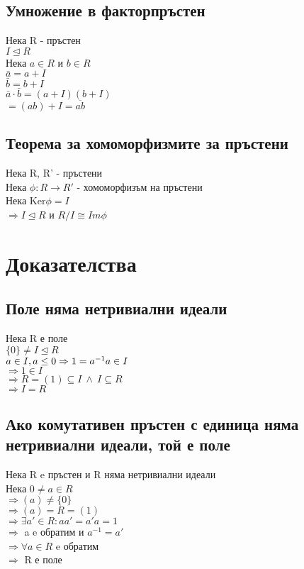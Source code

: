 \documentclass[12pt]{article}
\begin{document}
\clearpage
\subsection{Умножение в факторпръстен}
Нека R - пръстен\\
$I \trianglelefteq R$ \\
Нека $a \in R$ и $b \in R$ \\
$\bar{a} = a + I$\\
$\bar{b} = b + I$\\
$\bar{a} \cdot \bar{b} = (a+I)(b+I)$ \\
$=(ab)+I=\overline{ab}$

\subsection{Теорема за хомоморфизмите за пръстени}
Нека R, R' - пръстени \\
Нека $\phi : R \rightarrow R'$ - хомоморфизъм на пръстени  \\
Нека Ker$\phi = I$ \\
$\Rightarrow I \trianglelefteq R$ и $R/I \cong Im\phi$

\clearpage
\section{Доказателства}

\subsection{Поле няма нетривиални идеали}
Нека R е поле \\
$ \{ 0 \} \neq I \trianglelefteq R$ \\
$a \in I, a \leq 0 \\
\Rightarrow 1 = a^{-1}a \in I$ \\
$\Rightarrow 1 \in I$ \\
$\Rightarrow R = (1) \subseteq I \ \land \ I \subseteq R$ \\
$\Rightarrow I = R$

\subsection{Ако комутативен пръстен с единица няма нетривиални идеали, той е поле}

Нека R e пръстен и R няма нетривиални идеали \\
Нека $0 \neq a \in R$ \\
$\Rightarrow (a) \neq \{ 0 \}$\\
$\Rightarrow (a) = R = (1)$ \\
$\Rightarrow \exists a' \in R : aa'=a'a=1$\\
$\Rightarrow$ a e обратим и $a^{-1} = a'$\\ 
$\Rightarrow \forall a \in R$ e обратим\\
$\Rightarrow$ R е поле
\end{document}
